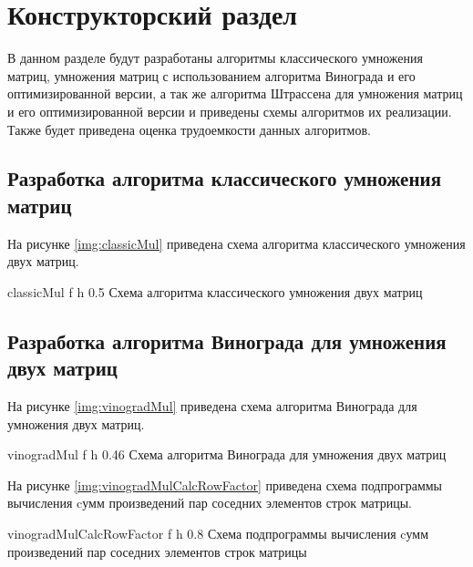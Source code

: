 \chapter{Конструкторский раздел}

В данном разделе будут разработаны алгоритмы классического умножения матриц, умножения матриц с использованием алгоритма Винограда и его оптимизированной версии, а так же алгоритма Штрассена для умножения матриц и его оптимизированной версии и приведены схемы алгоритмов их реализации. Также будет приведена оценка трудоемкости данных алгоритмов.

\section{Разработка алгоритма классического умножения матриц}

На рисунке \ref{img:classicMul} приведена схема алгоритма классического умножения двух матриц.

{classicMul} %
{f} %
{h} %
{0.5\textwidth} %
{Схема алгоритма классического умножения двух матриц} %
 
\clearpage

\section{Разработка алгоритма Винограда для умножения двух матриц}

На рисунке \ref{img:vinogradMul} приведена схема алгоритма Винограда для умножения двух матриц.

{vinogradMul} %
{f} %
{h} %
{0.46\textwidth} %
{Схема алгоритма Винограда для умножения двух матриц} %

\clearpage

На рисунке \ref{img:vinogradMulCalcRowFactor} приведена схема подпрограммы вычисления cумм произведений пар соседних элементов строк матрицы.

{vinogradMulCalcRowFactor} %
{f} %
{h} %
{0.8\textwidth} %
{Схема подпрограммы вычисления cумм произведений пар соседних элементов строк матрицы} %

